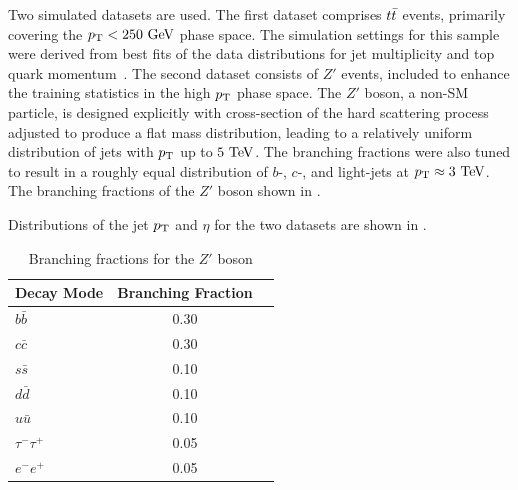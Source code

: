 Two simulated datasets are used.
The first dataset comprises $t\bar{t}$ events, primarily covering the $\pt < 250~\GeV$ phase space.
The simulation settings for this sample were derived from best fits of the data distributions for jet multiplicity and top quark momentum~\cite{ttbar1, ttbar2}.
The second dataset consists of $Z'$ events, included to enhance the training statistics in the high $p_{\text{T}}$ phase space.
The $Z'$ boson, a non-SM particle, is designed explicitly with cross-section of the hard scattering process adjusted to produce a flat mass distribution, leading to a relatively uniform distribution of jets with $p_{\text{T}}$ up to $5~\TeV$.
The branching fractions were also tuned to result in a roughly equal distribution of $b$-, $c$-, and light-jets at $\pt \approx 3~\TeV$.
The branching fractions of the $Z'$ boson shown in .

Distributions of the jet $p_{\text{T}}$ and $\eta$ for the two datasets are shown in .

\begin{table}[h]
    \centering
    \begin{tabular}{lcc}
        \toprule
        \midrule
        Decay Mode & Branching Fraction \\
        \midrule
        $b\bar{b}$ & 0.30 \\
        $c\bar{c}$ & 0.30 \\
        $s\bar{s}$ & 0.10 \\
        $d\bar{d}$ & 0.10 \\
        $u\bar{u}$ & 0.10 \\
        $\tau^-\tau^+$ & 0.05 \\
        $e^-e^+$ & 0.05 \\
        \bottomrule
    \end{tabular}
    \caption{Branching fractions for the $Z'$ boson \cite{Run2FTAlgs}}
    \label{tab:zprime_branching}
\end{table}


